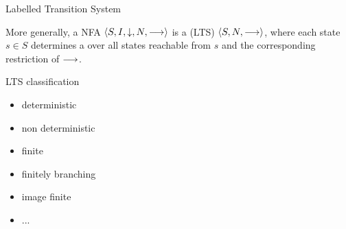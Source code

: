 \documentclass[aspectratio=169]{beamer}
\begin{document}

\begin{slide}{Labelled Transition System}
\small

More generally, a NFA $\mathopen{\langle}S,I,{\downarrow},N,\longrightarrow\mathclose{\rangle}$ is a  (LTS) $\mathopen{\langle}S,N,\longrightarrow\mathclose{\rangle}$, where each state $s \in S$ determines a  over all states reachable from $s$ and the corresponding restriction of $\longrightarrow$.

\begin{block}{LTS classification}
\begin{itemize}
\item \alert{deterministic}
\item \alert{non deterministic}
\item \alert{finite}
\item \alert{finitely branching}
\item \alert{image finite}
\item ...
\end{itemize}
\end{block}

\end{slide}




\end{document}
